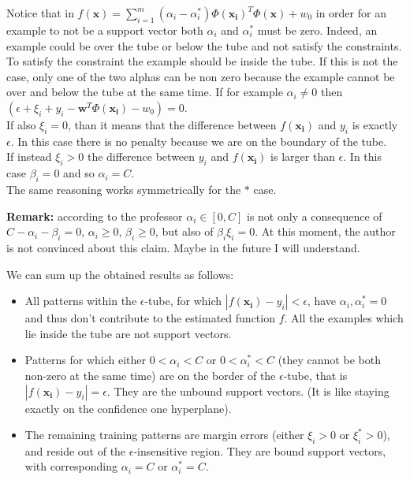 Notice that in
$f(\pmb{x}) = \sum_{i=1}^{m}(\alpha_{i}- \alpha_{i}^{*}) \Phi(\pmb{x_i})^{T}\Phi
(\pmb{x}) + w_{0}$
in order for an example to not be a support vector both $\alpha_{i}$ and
$\alpha_{i}^{*}$ must be zero. Indeed, an example could be over the tube or
below the tube and not satisfy the constraints. To satisfy the constraint the example
should be inside the tube. If this is not the case, only one of the two alphas can
be non zero because the example cannot be over and below the tube at the same time.
\newline
If for example $\alpha_{i}\neq 0$ then
$(\epsilon + \xi_{i}+ y_{i}- \pmb{w}^{T}\Phi(\pmb{x_i}) - w_{0}) = 0$.\\ If also
$\xi_{i}= 0$, than it means that the difference between $f(\pmb{x_i})$ and $y_{i}$
is exactly $\epsilon$. In this case there is no penalty because we are on the
boundary of the tube.\\If instead $\xi_{i}> 0$ the difference between $y_{i}$ and
$f(\pmb{x_i})$ is larger than $\epsilon$. In this case $\beta_{i}= 0$ and so
$\alpha_{i}= C$.\\ The same reasoning works symmetrically for the $*$ case.
\newline

\textbf{Remark:} according to the professor $\alpha_{i}\in [0,C]$ is not only a consequence
of $C - \alpha_{i}- \beta_{i}= 0$, $\alpha_{i}\geq 0$, $\beta_{i}\geq 0$, but
also of $\beta_{i}\xi_{i}= 0$. At this moment, the author is not convinced about
this claim. Maybe in the future I will understand.
\newline

We can sum up the obtained results as follows:
\begin{itemize}
	\item All patterns within the $\epsilon$-tube, for which
		$|f(\pmb{x_i})-y_{i}| < \epsilon$, have $\alpha_{i}, \alpha_{i}^{*}= 0$ and thus
		don't contribute to the estimated function $f$. All the examples which lie
		inside the tube are not support vectors.

	\item Patterns for which either $0 < \alpha_{i}< C$ or $0 < \alpha_{i}^{*}< C$
		(they cannot be both non-zero at the same time) are on the border of the $\epsilon$-tube,
		that is $|f(\pmb{x_i})-y_{i}| = \epsilon$. They are the unbound support vectors.
		(It is like staying exactly on the confidence one hyperplane).

	\item The remaining training patterns are margin errors (either $\xi_{i}> 0$
		or $\xi_{i}^{*}> 0$), and reside out of the $\epsilon$-insensitive region. They
		are bound support vectors, with corresponding $\alpha_{i}= C$ or
		$\alpha_{i}^{*}= C$.
\end{itemize}

